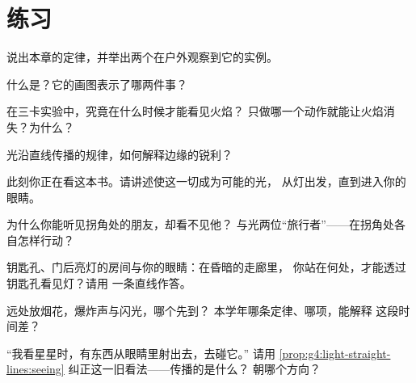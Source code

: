 \section{练习}

\begin{exercise}[$\star$]\label{exo:g4:light-straight-lines:1}
说出本章的定律，并举出两个在户外观察到它的实例。
\end{exercise}

\begin{exercise}[$\star$]\label{exo:g4:light-straight-lines:2}
什么是？它的画图表示了哪两件事？
\end{exercise}

\begin{exercise}[$\star$]\label{exo:g4:light-straight-lines:3}
在三卡实验中，究竟在什么时候才能看见火焰？
只做哪一个动作就能让火焰消失？为什么？
\end{exercise}

\begin{exercise}[$\star$]\label{exo:g4:light-straight-lines:4}
光沿直线传播的规律，如何解释边缘的锐利？
\end{exercise}

\begin{exercise}[$\star$]\label{exo:g4:light-straight-lines:5}
此刻你正在看这本书。请讲述使这一切成为可能的光，
从灯出发，直到进入你的眼睛。
\end{exercise}

\begin{exercise}[$\star$]\label{exo:g4:light-straight-lines:6}
为什么你能听见拐角处的朋友，却看不见他？
与光两位“旅行者”——在拐角处各自怎样行动？
\end{exercise}

\begin{exercise}[$\star$]\label{exo:g4:light-straight-lines:7}
钥匙孔、门后亮灯的房间与你的眼睛：在昏暗的走廊里，
你站在何处，才能透过钥匙孔看见灯？请用
一条直线作答。
\end{exercise}

\begin{exercise}[$\star$]\label{exo:g4:light-straight-lines:8}
远处放烟花，爆炸声与闪光，哪个先到？
本学年哪条定律、哪项，能解释
这段时间差？
\end{exercise}

\begin{exercise}[$\star$]\label{exo:g4:light-straight-lines:9}
“我看星星时，有东西从眼睛里射出去，去碰它。”
请用
\cref{prop:g4:light-straight-lines:seeing} 纠正这一旧看法——传播的是什么？
朝哪个方向？
\end{exercise}

